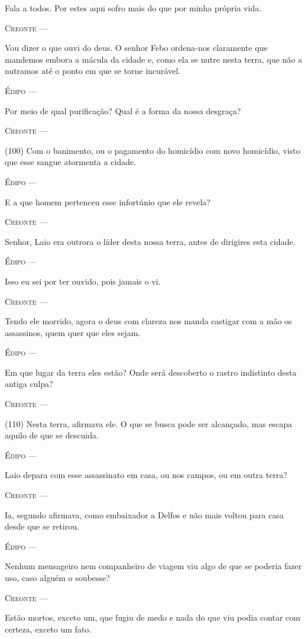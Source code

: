 Fala a todos. Por estes aqui sofro mais do que por minha própria vida.

\textsc{Creonte} ---

Vou dizer o que ouvi do deus. O senhor Febo ordena-nos claramente que
mandemos embora a mácula da cidade e, como ela se nutre nesta terra, que
não a nutramos até o ponto em que se torne incurável.

\textsc{Édipo} ---

Por meio de qual purificação? Qual é a forma da nossa desgraça?

\textsc{Creonte} ---

(100) Com o banimento, ou o pagamento do homicídio com novo homicídio,
visto que esse sangue atormenta a cidade.

\textsc{Édipo} ---

E a que homem pertenceu esse infortúnio que ele revela?

\textsc{Creonte} ---

Senhor, Laio era outrora o líder desta nossa terra, antes de dirigires
esta cidade.

\textsc{Édipo} ---

Isso eu sei por ter ouvido, pois jamais o vi.

\textsc{Creonte} ---

Tendo ele morrido, agora o deus com clareza nos manda castigar com a mão
os assassinos, quem quer que eles sejam.

\textsc{Édipo} ---

Em que lugar da terra eles estão? Onde será descoberto o rastro
indistinto desta antiga culpa?

\textsc{Creonte} ---

(110) Nesta terra, afirmava ele. O que se busca pode ser alcançado, mas
escapa aquilo de que se descuida.

\textsc{Édipo} ---

Laio depara com esse assassinato em casa, ou nos campos, ou em outra
terra?

\textsc{Creonte} ---

Ia, segundo afirmava, como embaixador a Delfos e não mais voltou para
casa desde que se retirou.

\textsc{Édipo} ---

Nenhum mensageiro nem companheiro de viagem viu algo de que se poderia
fazer uso, caso alguém o soubesse?

\textsc{Creonte} ---

Estão mortos, exceto um, que fugiu de medo e nada do que viu podia
contar com certeza, exceto um fato.

